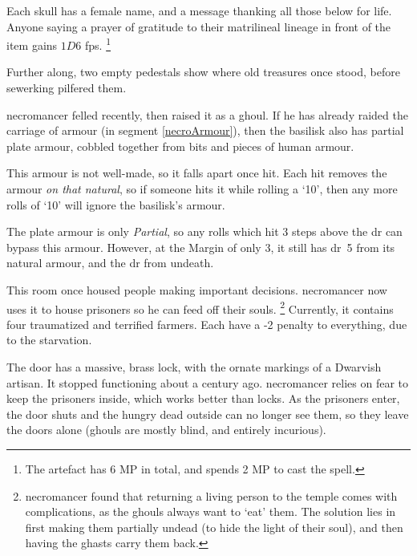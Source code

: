 \begin{multicols}{2}
Each skull has a female name, and a message thanking all those below for life.
Anyone saying a prayer of gratitude to their matrilineal lineage in front of the item gains $1D6$ \glspl{fp}.%
\footnote{The \gls{artefact} has 6 MP in total, and spends 2 MP to cast the spell.}

Further along, two empty pedestals show where old treasures once stood, before \gls{sewerking} pilfered them.%



\Gls{necromancer} felled  recently, then raised it as a ghoul.
If he has already raided the carriage of armour (in \gls{segment} \vref{necroArmour}), then the \gls{basilisk} also has partial plate armour, cobbled together from bits and pieces of human armour.

This armour is not well-made, so it falls apart once hit.
Each hit removes the armour \textit{on that \gls{natural}}, so if someone hits it while rolling a `10', then any more rolls of `10' will ignore the \gls{basilisk}'s armour.

The plate armour is only \textit{Partial}, so any rolls which hit 3 steps above the \gls{dr} can bypass this armour.
However, at the Margin of only 3, it still has \gls{dr}~5 from its natural armour, and the \gls{dr} from undeath.%

\undeadBasilisk

\boxPair[t]{
  \thenecromancer
}{
  \showStdSpells
}


This room once housed people making important decisions.
\Gls{necromancer} now uses it to house prisoners so he can feed off their souls.%
\footnote{\Gls{necromancer} found that returning a living person to the temple comes with complications, as the ghouls always want to `eat' them.
The solution lies in first making them partially undead (to hide the light of their soul), and then having the ghasts carry them back.}
Currently, it contains four traumatized and terrified farmers.
Each have a -2 penalty to everything, due to the starvation.

The door has a massive, brass lock, with the ornate markings of a Dwarvish artisan.
It stopped functioning about a century ago.
\Gls{necromancer} relies on fear to keep the prisoners inside, which works better than locks.
As the prisoners enter, the door shuts and the hungry dead outside can no longer see them, so they leave the doors alone (ghouls are mostly blind, and entirely incurious).


\end{multicols}
